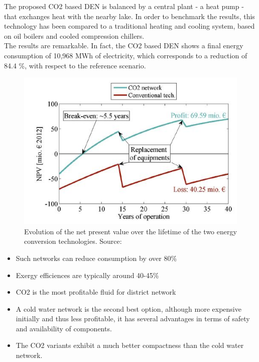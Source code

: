 \documentclass{article}
\begin{document}
The proposed CO2 based DEN is balanced by a central plant - a heat pump - that exchanges heat with the nearby lake. In order to benchmark the results, this technology has been compared to a traditional heating and cooling system, based on oil boilers and cooled compression chillers.\\
The results are remarkable. In fact, the CO2 based DEN shows a final energy consumption of 10,968 MWh of electricity, which corresponds to a reduction of 84.4 \%, with respect to the reference scenario. 

\begin{figure}[h!]
\centering
\includegraphics[width=1\textwidth]{henchoz_costs.JPG}
\caption{Evolution of the net present value over the lifetime of the two energy conversion technologies. Source: \cite{henchozPotentialRefrigerantBased}}
\label{fig:henchoz_costs}
\end{figure}

\begin{itemize}
	\item Such networks can reduce consumption by over 80\%
	\item Exergy efficiences are typically around 40-45\%
	\item CO2 is the most profitable fluid for district network
	\item A cold water network is the second best option, although more expensive initially
	and thus less profitable, it has several advantages in terms of safety and availability of
	components.
	\item The CO2 variants exhibit a much better compactness than the cold water network.
\end{itemize}
\cite{henchozPotentialRefrigerantBased}
\end{document}
